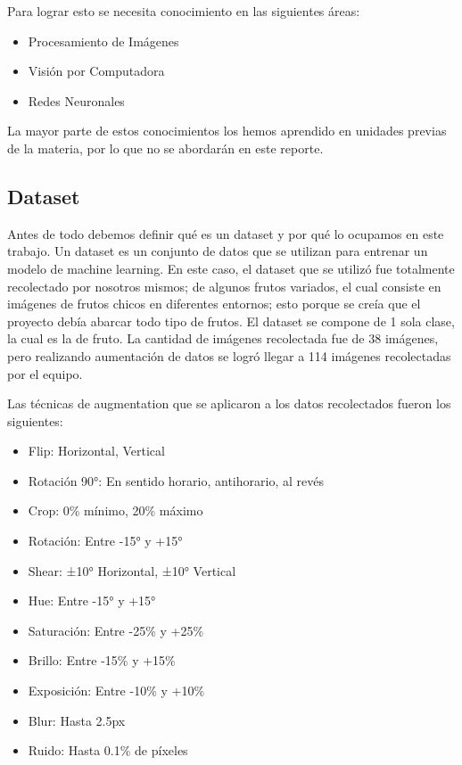 \documentclass[conference]{IEEEtran}
\begin{document}
Para lograr esto se necesita conocimiento en las siguientes áreas:
\begin{itemize}
    \item Procesamiento de Imágenes
    \item Visión por Computadora
    \item Redes Neuronales
\end{itemize}

La mayor parte de estos conocimientos los hemos aprendido en unidades previas de la materia, por lo que no se abordarán en este reporte.

\subsection{Dataset}
Antes de todo debemos definir qué es un dataset y por qué lo ocupamos en este trabajo.
Un dataset es un conjunto de datos que se utilizan para entrenar un modelo de machine learning. En este caso, el dataset que se utilizó fue totalmente recolectado por nosotros mismos; de algunos frutos variados,\cite{roboflowLittleFruit} el cual consiste en imágenes de frutos chicos en diferentes entornos; esto porque se creía que el proyecto debía abarcar todo tipo de frutos. El dataset se compone de 1 sola clase, la cual es la de fruto. La cantidad de imágenes recolectada fue de 38 imágenes, pero realizando aumentación de datos se logró llegar a 114 imágenes recolectadas por el equipo.

Las técnicas de augmentation que se aplicaron a los datos recolectados fueron los siguientes:
\begin{itemize}
    \item Flip: Horizontal, Vertical
    \item Rotación 90°: En sentido horario, antihorario, al revés
    \item Crop: 0\% mínimo, 20\% máximo
    \item Rotación: Entre -15° y +15°
    \item Shear: ±10° Horizontal, ±10° Vertical
    \item Hue: Entre -15° y +15°
    \item Saturación: Entre -25\% y +25\%
    \item Brillo: Entre -15\% y +15\%
    \item Exposición: Entre -10\% y +10\%
    \item Blur: Hasta 2.5px
    \item Ruido: Hasta 0.1\% de píxeles
\end{itemize}
\end{document}
